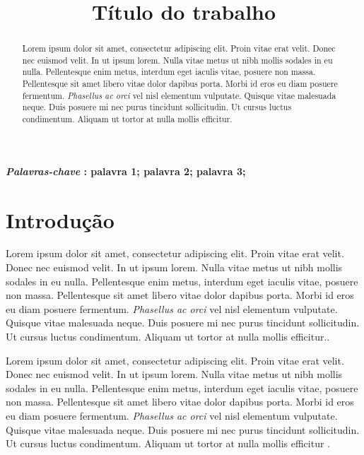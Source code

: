 \documentclass[10pt, conference, compsocconf]{IEEEtran}
\begin{document}
\title{Título do trabalho}

\author{
}

\maketitle

\begin{abstract}
Lorem ipsum dolor sit amet, consectetur adipiscing elit. Proin vitae erat velit. Donec nec euismod velit. In ut ipsum lorem. Nulla vitae metus ut nibh mollis sodales in eu nulla. Pellentesque enim metus, interdum eget iaculis vitae, posuere non massa. Pellentesque sit amet libero vitae dolor dapibus porta. Morbi id eros eu diam posuere fermentum. \textit{Phasellus ac orci} vel nisl elementum vulputate. Quisque vitae malesuada neque. Duis posuere mi nec purus tincidunt sollicitudin. Ut cursus luctus condimentum. Aliquam ut tortor at nulla mollis efficitur.

\end{abstract}


\textbf{\textit{Palavras-chave} : palavra 1; palavra 2; palavra 3; }


\IEEEpeerreviewmaketitle

\section{Introdução}
Lorem ipsum dolor sit amet, consectetur adipiscing elit. Proin vitae erat velit. Donec nec euismod velit. In ut ipsum lorem. Nulla vitae metus ut nibh mollis sodales in eu nulla. Pellentesque enim metus, interdum eget iaculis vitae, posuere non massa. Pellentesque sit amet libero vitae dolor dapibus porta. Morbi id eros eu diam posuere fermentum. \textit{Phasellus ac orci} vel nisl elementum vulputate. Quisque vitae malesuada neque. Duis posuere mi nec purus tincidunt sollicitudin. Ut cursus luctus condimentum. Aliquam ut tortor at nulla mollis efficitur.\cite{chandler2009manual}.

Lorem ipsum dolor sit amet, consectetur adipiscing elit. Proin vitae erat velit. Donec nec euismod velit. In ut ipsum lorem. Nulla vitae metus ut nibh mollis sodales in eu nulla. Pellentesque enim metus, interdum eget iaculis vitae, posuere non massa. Pellentesque sit amet libero vitae dolor dapibus porta. Morbi id eros eu diam posuere fermentum. \textit{Phasellus ac orci} vel nisl elementum vulputate. Quisque vitae malesuada neque. Duis posuere mi nec purus tincidunt sollicitudin. Ut cursus luctus condimentum. Aliquam ut tortor at nulla mollis efficitur \cite{SavinginVideoGames2011}.
\end{document}
